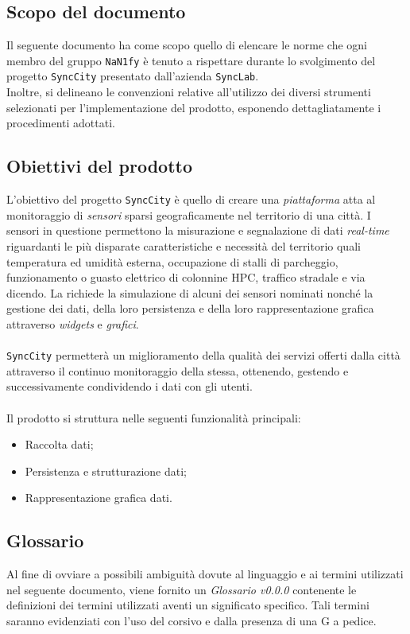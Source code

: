 \subsection{Scopo del documento}
Il seguente documento ha come scopo quello di elencare le norme che ogni membro del gruppo \texttt{NaN1fy} è tenuto a rispettare durante lo svolgimento del progetto \texttt{SyncCity} presentato dall'azienda  \texttt{SyncLab}.\\
Inoltre, si delineano le convenzioni relative all'utilizzo dei diversi strumenti selezionati per l'implementazione del prodotto, esponendo dettagliatamente i procedimenti adottati.
\subsection{Obiettivi del prodotto}
L'obiettivo del progetto \texttt{SyncCity} è quello di creare una \textit{piattaforma} atta al monitoraggio di \textit{sensori} sparsi geograficamente nel territorio di una città. I sensori in questione permettono la misurazione e segnalazione di dati \textit{real-time} riguardanti le più disparate caratteristiche e necessità del territorio quali temperatura ed umidità esterna, occupazione di stalli di parcheggio, funzionamento o guasto elettrico di colonnine HPC, traffico stradale e via dicendo. La  richiede la simulazione di alcuni dei sensori nominati nonché la gestione dei dati, della loro persistenza e della loro rappresentazione grafica attraverso \textit{widgets} e \textit{grafici}. \\\\\texttt{SyncCity} permetterà un miglioramento della qualità dei servizi offerti dalla città attraverso il continuo monitoraggio della stessa, ottenendo, gestendo e successivamente condividendo i dati con gli utenti. 
\\\\
Il prodotto si struttura nelle seguenti funzionalità principali:
\begin{itemize}
	\setlength\itemsep{0em}
	\item Raccolta dati;
	\item Persistenza e strutturazione dati;
	\item Rappresentazione grafica dati.
\end{itemize}
\subsection{Glossario}
Al fine di ovviare a possibili ambiguità dovute al linguaggio e ai termini utilizzati nel seguente documento, viene fornito un \textit{Glossario v0.0.0} contenente le definizioni dei termini utilizzati aventi un significato specifico. Tali termini saranno evidenziati con l'uso del corsivo e dalla presenza di una G a pedice.
